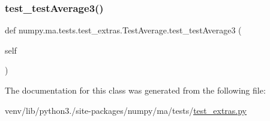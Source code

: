 \subsubsection{\texorpdfstring{test\+\_\+test\+Average3()}{test\_testAverage3()}}
{\footnotesize\ttfamily def numpy.\+ma.\+tests.\+test\+\_\+extras.\+Test\+Average.\+test\+\_\+test\+Average3 (\begin{DoxyParamCaption}\item[{}]{self }\end{DoxyParamCaption})}



The documentation for this class was generated from the following file\+:\begin{DoxyCompactItemize}
\item 
venv/lib/python3./site-\/packages/numpy/ma/tests/\hyperlink{test__extras_8py}{test\+\_\+extras.\+py}\end{DoxyCompactItemize}

